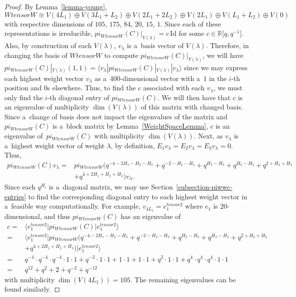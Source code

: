 \documentclass[10pt,a4paper]{amsart}
\numberwithin{equation}{section}
\theoremstyle{definition}
\def\pi{pi}
\def\otimes{ tensor }
\begin{document}
\begin{proof}
 By Lemma~\ref{lemma-young},
 \[W \otimes W \cong V(4L_1) \oplus V(3L_1+L_2) \oplus V(2L_1+2L_2) \oplus V(2L_1) \oplus V(L_1+L_2) \oplus V(0)\]
 with respective dimensions of $105$, $175$, $84$, $20$, $15$, $1$. Since each of these representations is irreducible, $\pi_{W \otimes W}(C)|_{V(\lambda)} = c\,\mathrm{Id}$ for some $c \in \mathbb{R}\big[q,q^{-1}\big]$. Also, by construction of each $V(\lambda)$, $v_\lambda$ is a~basis vector of $V(\lambda)$. Therefore, in changing the basis of $W \otimes W$ to compute $\pi_{W \otimes W}(C)|_{V(\lambda)}$, we will have
 $\pi_{W \otimes W}(C)|_{V(\lambda)}(1,1) = \langle v_\lambda|\pi_{W \otimes W}(C)|_{V(\lambda)}|v_\lambda \rangle$
 since we may express each highest weight vector $v_\lambda$ as a~$400$-dimensional vector with a~$1$ in the $i$-th position and $0$s elsewhere. Thus, to find the $c$ associated with each $v_\lambda$, we must only find the $i$-th diagonal entry of $\pi_{W \otimes W}(C)$. We will then have that $c$ is an eigenvalue of multiplicity $\operatorname{dim}(V(\lambda))$ of this matrix with changed basis. Since a~change of basis does not impact the eigenvalues of the matrix and $\pi_{W \otimes W}(C)$ is a~block matrix by Lemma~\ref{WeightSpaceLemma}, $c$ is an eigenvalue of~$\pi_{W \otimes W}(C)$ with multiplicity $\operatorname{dim}(V(\lambda))$.
 Next, as $v_\lambda$ is a~highest weight vector of weight $\lambda$, by definition, $E_1v_\lambda = E_2v_\lambda = E_3v_\lambda = 0$.
 Thus,
 \begin{align*}
 \pi_{W \otimes W}(C)v_\lambda ={}& \pi_{W \otimes W}\bigl(q^{-4-2H_1-H_2-H_3}
 +q^{-2-H_2-H_3}
 +q^{H_2-H_3}
 +q^{H_3-H_2}
 +q^{2+H_2+H_3}\\
 &
 +q^{4+2H_1+H_2+H_3}\bigr)v_\lambda.
 \end{align*}
 Since each $q^{H_i}$ is a~diagonal matrix, we may use Section~\ref{subsection-piwwc-entries} to find the corresponding diagonal entry to each highest weight vector in a~feasible way computationally. For example, $v_{4L_1} = e_1^{\otimes 2}$ where $e_1$ is $20$-dimensional, and thus $\pi_{W \otimes W}(C)$ has an eigenvalue of
 \begin{align*}
 c ={}& \big\langle e_1^{\otimes 2}|\pi_{W \otimes W}(C)|e_1^{\otimes 2} \big\rangle \\
 ={}&\big\langle e_1^{\otimes 2}|\pi_{W \otimes W}\bigl(q^{-4-2H_1-H_2-H_3}
 +q^{-2-H_2-H_3}
 +q^{H_2-H_3}
 +q^{H_3-H_2}
 +q^{2+H_2+H_3}\\
 &
 +q^{4+2H_1+H_2+H_3}\bigr)| e_1^{\otimes 2}\big\rangle \\
 ={}& q^{-4}\cdot q^{-4} \cdot q^{-4} \cdot 1 \cdot 1 + q^{-2}\cdot 1 \cdot 1+1\cdot 1+1\cdot 1+q^2\cdot 1\cdot 1 +q^4\cdot q^4\cdot q^4\cdot 1\cdot 1 \\
 ={}& q^{12}+q^2+2+q^{-2}+q^{-12}
 \end{align*}
 with multiplicity $\operatorname{dim}(V(4L_1)) = 105$. The remaining eigenvalues can be found similarly.
\end{proof}
\end{document}
